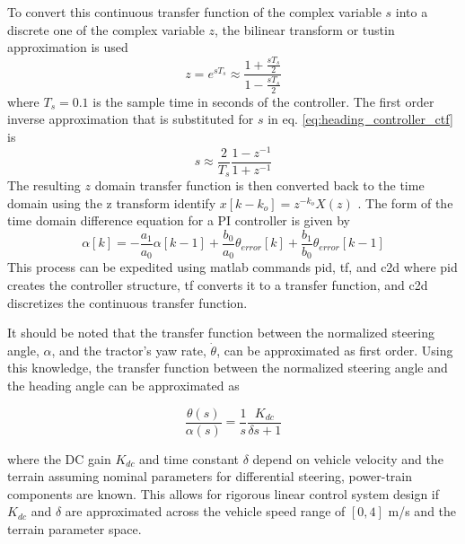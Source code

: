To convert this continuous transfer function of the complex variable $s$ into a discrete one of the complex variable $z$, the bilinear transform or tustin approximation is used
\begin{equation}
        z = e^{sT_s} \approx \frac{1+\frac{sT_s}{2}}{1-\frac{sT_s}{2}}
\end{equation}
where $T_s= 0.1$ is the sample time in seconds of the controller. The first order inverse approximation that is substituted for $s$ in eq. \ref{eq:heading_controller_ctf} is
\begin{equation}\label{eq:s2z}
        s \approx \frac{2}{T_s}\frac{1-z^{-1}}{1+z^{-1}}
\end{equation}
The resulting $z$ domain transfer function is then converted back to the time domain using the z transform identify $x[k-k_o] = z^{-k_o}X(z)$ \cite{hansen2014fourier}. The form of the time domain difference equation for a PI controller is given by 
\begin{equation}
    \alpha[k] = -\frac{a_1}{a_0}\alpha[k-1] + \frac{b_0}{a_0}\theta_{error}[k] + \frac{b_1}{b_0}\theta_{error}[k-1]
\end{equation}
This process can be expedited using matlab commands pid, tf, and c2d where pid creates the controller structure, tf converts it to a transfer function, and c2d discretizes the continuous transfer function.

It should be noted that the transfer function between the normalized steering angle, $\alpha$, and the tractor's yaw rate, $\dot\theta$, can be approximated as first order. Using this knowledge, the transfer function between the normalized steering angle and the heading angle can be approximated as
\begin{linenomath*}
    \begin{equation}\label{eq:steer_heading_transfer_function}
        \frac{\theta(s)}{\alpha(s)} = \frac{1}{s}\frac{K_{dc}}{\delta s + 1}
    \end{equation}
\end{linenomath*}
where the DC gain $K_{dc}$ and time constant $\delta$ depend on vehicle velocity and the terrain assuming nominal parameters for differential steering, power-train components are known. This allows for rigorous linear control system design if $K_{dc}$ and $\delta$ are approximated across the vehicle speed range of $[0,4]$ m/s and the terrain parameter space. 

